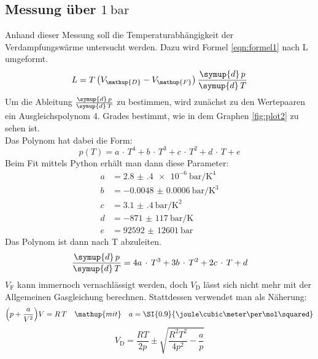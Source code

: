 \documentclass[
  bibliography=totoc,     %
  captions=tableheading,  %
  titlepage=firstiscover, %
]{scrartcl}
\begin{document}
\subsection{Messung über $\SI{1}{\bar}$}
Anhand dieser Messung soll die Temperaturabhängigkeit der Verdampfungswärme untersucht werden.
Dazu wird Formel \eqref{eqn:formel1} nach L umgeformt.
\begin{equation}
  L = T \left( V_{\mathup{D}} - V_{\mathup{F}} \right) \frac{\symup{d}\,p}{\symup{d}\,T}
  \label{eqn:Lmitabl}
\end{equation}
Um die Ableitung $\frac{\symup{d}\,p}{\symup{d}\,T}$ zu bestimmen, wird zunächst zu den
Wertepaaren ein Ausgleichspolynom 4. Grades bestimmt, wie in dem Graphen \ref{fig:plot2} zu sehen ist.\\
Das Polynom hat dabei die Form:
\begin{equation}
  p \left( T \right) = a \, \cdot \, T^4 + b \, \cdot \, T^3 + c \, \cdot \, T^2 + d \, \cdot \, T + e
  \label{eqn:polynomP}
\end{equation}
Beim Fit mittels Python erhält man dann diese Parameter:\\
\begin{align}
  a &= \SI{2.8(4)e-6}{\bar\per\kelvin\tothe{4}}\\
  b &= \SI{-0.0048(6)}{\bar\per\cubic\kelvin}\\
  c &= \SI{3.1(4)}{\bar\per\kelvin\squared}\\
  d &= \SI{-871(117)}{\bar\per\kelvin}\\
  e &= \SI{92592(12601)}{\bar}
\end{align}
Das Polynom ist dann nach T abzuleiten.\\
\begin{equation}
  \frac{\symup{d}\,p}{\symup{d}\,T} = 4a \, \cdot \, T^3 + 3b \, \cdot \, T^2 + 2c \, \cdot \, T + d
  \label{eqn:dpolynomPdT}
\end{equation}
$V_{\mathup{F}}$ kann immernoch vernachlässigt werden, doch
$V_{\mathup{D}}$ lässt sich nicht mehr mit der Allgemeinen Gasgleichung berechnen.
Stattdessen verwendet man als Näherung:
\begin{align}
  \Bigl( p + \frac{a}{V^2} \Bigr) V &= R \, T &{\mathup{mit}}& &a = \SI{0.9}{\joule\cubic\meter\per\mol\squared}
  \label{eqn:neuVd}
\end{align}
\begin{equation}
  V_{\mathup{D}} = \frac{RT}{2p} \pm \sqrt{\frac{R^2T^2}{4p^2}-\frac{a}{p}}
  \label{eqn:Vd}
\end{equation}
\end{document}
